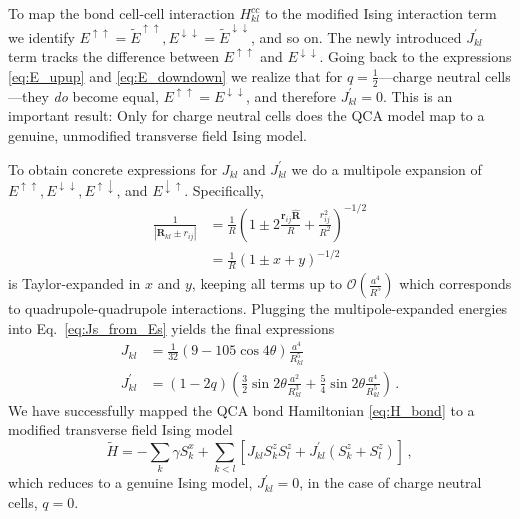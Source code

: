 %
To map the bond cell-cell interaction $H^{cc}_{kl}$ to the modified Ising
interaction term we identify $E^{\uparrow\uparrow} =
\tilde{E}^{\uparrow\uparrow}, E^{\downarrow\downarrow} =
\tilde{E}^{\downarrow\downarrow}$, and so on. The newly introduced
$J^{\prime}_{kl}$ term tracks the difference between $E^{\uparrow\uparrow}$ and
$E^{\downarrow\downarrow}$. Going back to the expressions \eqref{eq:E_upup} and
\eqref{eq:E_downdown} we realize that for $q = \frac{1}{2}$---charge neutral
cells---they \emph{do} become equal, $E^{\uparrow\uparrow} =
E^{\downarrow\downarrow}$, and therefore $J^{\prime}_{kl} = 0$. This is an
important result: Only for charge neutral cells does the QCA model map to a
genuine, unmodified transverse field Ising model.

To obtain concrete expressions for $J_{kl}$ and $J^{\prime}_{kl}$ we do a
multipole expansion of $E^{\uparrow\uparrow}, E^{\downarrow\downarrow},
E^{\uparrow\downarrow}$, and $E^{\downarrow\uparrow}$. Specifically,
%
\begin{equation}
\begin{split}
  \frac{1}{\left| \bm{R}_{kl} \pm r_{ij} \right|}
  &=
  \frac{1}{R}
  \left( 
    1 \pm 2 \frac{\bm{r}_{ij} \hat{\bm{R}}}{R} + \frac{r_{ij}^2}{R^2}
  \right)^{-1/2} \\
  &=
  \frac{1}{R} \left( 1 \pm x + y \right)^{-1/2}
\end{split}
\end{equation}
%
is Taylor-expanded in $x$ and $y$, keeping all terms up to
$\mathcal{O}\left(\frac{a^4}{R^5}\right)$ which corresponds to
quadrupole-quadrupole interactions. Plugging the multipole-expanded energies
into Eq.~\eqref{eq:Js_from_Es} yields the final expressions
%
\begin{align}
  J_{kl}
  &=
  \frac{ 1 }{ 32 }
  \left(
    9 - 105 \cos{4 \theta}
  \right)
  \frac{ a^4 }{ R_{kl}^5 }
  \\
  J^{\prime}_{kl}
  &=
  \left( 1 - 2 q \right)
  \left(
    \frac{ 3 }{ 2 } \sin{2 \theta} \frac{ a^2 }{ R_{kl}^3 } +
    \frac{ 5 }{ 4 } \sin{2 \theta} \frac{ a^4 }{ R_{kl}^5 }
  \right) \, .
\end{align}
%
We have successfully mapped the QCA bond Hamiltonian \eqref{eq:H_bond} to a
modified transverse field Ising model
\begin{equation}
  \label{eq:H_Ising}
  \tilde{H}
  =
  - \sum_k \gamma S^x_k
  + \sum_{k<l}
    \left[
      J_{kl} S^z_k S^z_l + 
      J^{\prime}_{kl} \left( S^z_k + S^z_l \right)
    \right] \, ,
\end{equation}
which reduces to a genuine Ising model, $J^{\prime}_{kl} = 0$, in the case of
charge neutral cells, $q = 0$.

